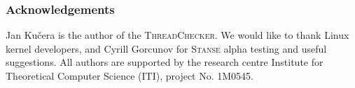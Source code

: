 \documentclass[10pt]{llncs}
\newcommand{\Stanse}{\textsc{Stanse}\xspace}
\newcommand{\TC}{\textsc{ThreadChecker}\xspace}
\begin{document}
\subsubsection{Acknowledgements}
\label{sec:acknowledgements}

Jan Ku\v{c}era is the author of the \TC. We would like to thank Linux kernel
developers, and Cyrill Gorcunov for \Stanse alpha testing and useful
suggestions. All authors are supported by the research centre Institute for
Theoretical Computer Science (ITI), project No. 1M0545.



\end{document}
